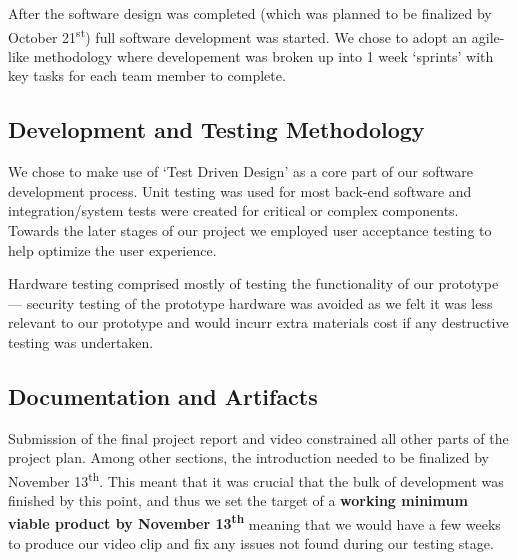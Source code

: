 \documentclass[conference]{IEEEtran}
\begin{document}
	After the software design was completed (which was planned to be finalized by October 21\textsuperscript{st}) full software development was started. We chose to adopt an agile-like methodology where developement was broken up into 1 week `sprints' with key tasks for each team member to complete.

\subsection{Development and Testing Methodology}
	We chose to make use of `Test Driven Design' as a core part of our software development process. Unit testing was used for most back-end software and integration/system tests were created for critical or complex components. Towards the later stages of our project we employed user acceptance testing to help optimize the user experience.

	Hardware testing comprised mostly of testing the functionality of our prototype --- security testing of the prototype hardware was avoided as we felt it was less relevant to our prototype and would incurr extra materials cost if any destructive testing was undertaken.

\subsection{Documentation and Artifacts}	
	Submission of the final project report and video constrained all other parts of the project plan. Among other sections, the introduction needed to be finalized by November 13\textsuperscript{th}. This meant that it was crucial that the bulk of development was finished by this point, and thus we set the target of a \textbf{working minimum viable product by November 13\textsuperscript{th}} meaning that we would have a few weeks to produce our video clip and fix any issues not found during our testing stage.
\end{document}
